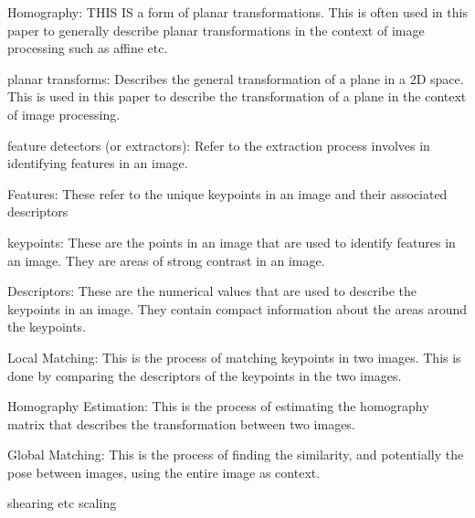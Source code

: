 

Homography: THIS IS a form of planar transformations. This is often used in this paper to generally describe planar transformations in the context of image processing such as affine etc.

planar transforms: Describes the general transformation of a plane in a 2D space. This is used in this paper to describe the transformation of a plane in the context of image processing.

feature detectors (or extractors): Refer to the extraction process involves in identifying features in an image. 

Features: These refer to the unique keypoints in an image and their associated descriptors

keypoints: These are the points in an image that are used to identify features in an image. They are areas of strong contrast in an image.

Descriptors: These are the numerical values that are used to describe the keypoints in an image. They contain compact information about the areas around the keypoints.

Local Matching: This is the process of matching keypoints in two images. This is done by comparing the descriptors of the keypoints in the two images.

Homography Estimation: This is the process of estimating the homography matrix that describes the transformation between two images.

Global Matching: This is the process of finding the similarity, and potentially the pose between images, using the entire image as context. 


shearing etc scaling 